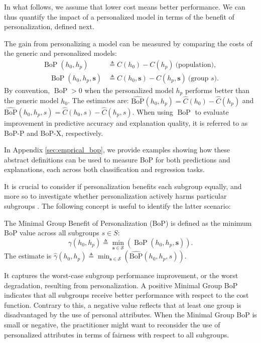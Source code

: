 In what follows, we assume that lower cost means better performance. We can thus quantify the impact of a personalized model in terms of the benefit of personalization, defined next.


\begin{definition}  \label{BoP} The gain from personalizing a model can be measured by comparing the costs of the generic and personalized models:
\begin{equation}
\begin{split}
    \operatorname{BoP}(h_0, h_p) & \triangleq C(h_0) - C(h_p) ~\text{(population)}, \\
    \quad \operatorname{BoP}(h_0, h_p, \mathbf{s}) & \triangleq C(h_0,\mathbf{s}) - C(h_p, \mathbf{s})~\text{(group $s$)}.
\end{split}
\end{equation}
By convention, $\operatorname{BoP} > 0$ when the personalized model $h_p$ performs better than the generic model $h_0$. 
The estimates are: $\operatorname{\hat{BoP}}(h_0, h_p) =  \hat{C}(h_0) - \hat{C}(h_p)$ and $\operatorname{\hat{BoP}}(h_0, h_p, s) =  \hat{C}(h_0, s) - \hat{C}(h_p, s)$. When using $\operatorname{BoP}$ to evaluate improvement in predictive accuracy and explanation quality, it is referred to as BoP-P and BoP-X, respectively.
\end{definition}

In Appendix \ref{sec:emprical_bop}, we provide examples showing how these abstract definitions can be used to measure BoP for both predictions and explanations, each across both classification and regression tasks.





It is crucial to consider if personalization benefits each subgroup equally, and more so to investigate whether personalization actively harms particular subgroups \citep{monteiro2022epistemic}. The following concept is useful to identify the latter scenario:

\begin{definition}  \label{total BoP}The Minimal Group Benefit of Personalization (BoP) is defined as the minimum BoP value across all subgroups \(s \in S\):
\begin{equation}
\gamma\left(h_0, h_p\right) \triangleq
\min _{\mathbf{s} \in \mathcal{S}}
(\operatorname{BoP}(h_0, h_p, \mathbf{s})).
\end{equation}
The estimate is $\hat{\gamma}\left(h_0, h_p\right) \triangleq
\min _{\mathbf{s} \in \mathcal{S}}
(\operatorname{\hat{BoP}}(h_0, h_p, s))$.
\end{definition}

It captures the worst-case subgroup performance improvement, or the worst degradation, resulting from personalization. A positive Minimal Group BoP indicates that all subgroups receive better performance with respect to the cost function. Contrary to this, a negative value reflects that at least one group is disadvantaged by the use of personal attributes. When the Minimal Group BoP is small or negative, the practitioner might want to reconsider the use of personalized attributes in terms of fairness with respect to all subgroups.

